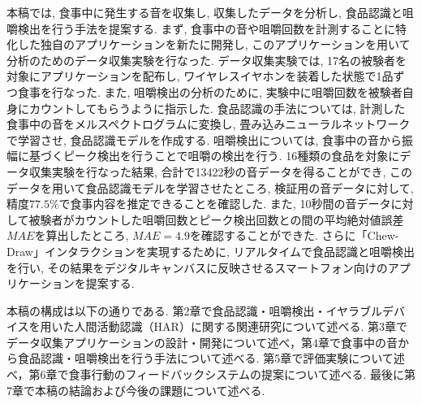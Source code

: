 本稿では, 食事中に発生する音を収集し, 収集したデータを分析し, 食品認識と咀嚼検出を行う手法を提案する. まず, 食事中の音や咀嚼回数を計測することに特化した独自のアプリケーションを新たに開発し, このアプリケーションを用いて分析のためのデータ収集実験を行なった. データ収集実験では, 17名の被験者を対象にアプリケーションを配布し, ワイヤレスイヤホンを装着した状態で1品ずつ食事を行なった. また, 咀嚼検出の分析のために, 実験中に咀嚼回数を被験者自身にカウントしてもらうように指示した. 食品認識の手法については, 計測した食事中の音をメルスペクトログラムに変換し, 畳み込みニューラルネットワークで学習させ, 食品認識モデルを作成する. 咀嚼検出については, 食事中の音から振幅に基づくピーク検出を行うことで咀嚼の検出を行う. 16種類の食品を対象にデータ収集実験を行なった結果, 合計で13422秒の音データを得ることができ, このデータを用いて食品認識モデルを学習させたところ, 検証用の音データに対して, 精度$77.5\%$で食事内容を推定できることを確認した. また, 10秒間の音データに対して被験者がカウントした咀嚼回数とピーク検出回数との間の平均絶対値誤差$MAE$を算出したところ, $MAE = 4.9$を確認することができた. さらに「Chew-Draw」インタラクションを実現するために, リアルタイムで食品認識と咀嚼検出を行い, その結果をデジタルキャンバスに反映させるスマートフォン向けのアプリケーションを提案する.

本稿の構成は以下の通りである.
第2章で食品認識・咀嚼検出・イヤラブルデバイスを用いた人間活動認識（HAR）に関する関連研究について述べる. 第3章でデータ収集アプリケーションの設計・開発について述べ，第4章で食事中の音から食品認識・咀嚼検出を行う手法について述べる. 第5章で評価実験について述べ，第6章で食事行動のフィードバックシステムの提案について述べる. 最後に第7章で本稿の結論および今後の課題について述べる.

